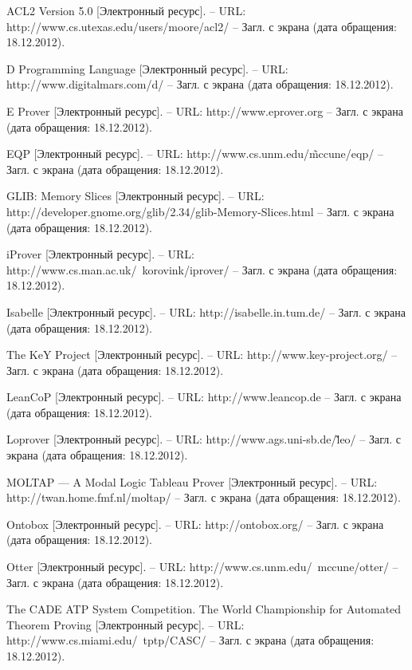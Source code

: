\begin{thebibliography}{99}

 ACL2 Version 5.0 [Электронный ресурс]. -- URL: http://www.cs.utexas.edu/users/moore/acl2/ -- Загл. с экрана (дата обращения: 18.12.2012).

 D Programming Language [Электронный ресурс]. -- URL: http://www.digitalmars.com/d/ -- Загл. с экрана (дата обращения: 18.12.2012).

 E Prover [Электронный ресурс]. -- URL: http://www.eprover.org -- Загл. с экрана (дата обращения: 18.12.2012).

 EQP [Электронный ресурс]. -- URL: http://www.cs.unm.edu/\~mccune/eqp/ -- Загл. с экрана (дата обращения: 18.12.2012).

 GLIB: Memory Slices [Электронный ресурс]. -- URL: http://developer.gnome.org/glib/2.34/glib-Memory-Slices.html -- Загл. с экрана (дата обращения: 18.12.2012).

 iProver [Электронный ресурс]. -- URL: http://www.cs.man.ac.uk/~korovink/iprover/ -- Загл. с экрана (дата обращения: 18.12.2012).

 Isabelle [Электронный ресурс]. -- URL: http://isabelle.in.tum.de/ -- Загл. с экрана (дата обращения: 18.12.2012).

 The KeY Project [Электронный ресурс]. -- URL: http://www.key-project.org/ -- Загл. с экрана (дата обращения: 18.12.2012).

 LeanCoP [Электронный ресурс]. -- URL: http://www.leancop.de -- Загл. с экрана (дата обращения: 18.12.2012).

 Loprover [Электронный ресурс]. -- URL: http://www.ags.uni-sb.de/\~leo/ -- Загл. с экрана (дата обращения: 18.12.2012).

 MOLTAP — A Modal Logic Tableau Prover [Электронный ресурс]. -- URL: http://twan.home.fmf.nl/moltap/ -- Загл. с экрана (дата обращения: 18.12.2012).

 Ontobox [Электронный ресурс]. -- URL: http://ontobox.org/ -- Загл. с экрана (дата обращения: 18.12.2012).

 Otter [Электронный ресурс]. -- URL: http://www.cs.unm.edu/~mccune/ot\-ter/ -- Загл. с экрана (дата обращения: 18.12.2012).

 The CADE ATP System Competition. The World Championship for Automated Theorem Proving [Электронный ресурс]. -- URL: http://www.cs.miami.edu/~tptp/CASC/ -- Загл. с экрана (дата обращения: 18.12.2012).


\end{thebibliography}
